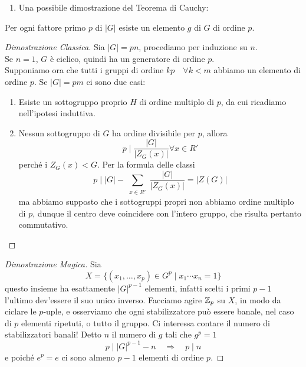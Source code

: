 \begin{multicols}{2}
\begin{enumerate}
	\item Una possibile dimostrazione del Teorema di Cauchy:
\end{enumerate}

\begin{theorem}[di Cauchy] \label{cauchy}
	Per ogni fattore primo $ p $ di $ |G| $ esiste un elemento $ g $ di $ G $ di ordine $ p $.
\end{theorem}
\begin{proof}[Dimostrazione Classica]
	Sia $ |G|= pn $, procediamo per induzione su $ n $. \\
	
	Se $ n = 1 $, $ G $ è ciclico, quindi ha un generatore di ordine $ p $. \\
	
	Supponiamo ora che tutti i gruppi di ordine $ kp  \quad\forall k < m$ abbiamo un elemento di ordine $ p $. Se $ |G|=pm $ ci sono due casi:
	\begin{enumerate}
		\item Esiste un sottogruppo proprio $ H $ di ordine multiplo di $ p $, da cui ricadiamo nell'ipotesi induttiva.
		\item Nessun sottogruppo di $ G $ ha ordine divisibile per $ p $, allora
		\[ p \mid \frac{|G|}{|Z_G(x)|} \forall x \in R' \] perché i $ Z_G(x) < G $. Per la formula delle classi
		\[ p \mid |G| - \sum_{\substack{x \in R'}} \frac{|G|}{|Z_G(x)|} = |Z(G)| \]
		ma abbiamo supposto che i sottogruppi propri non abbiamo ordine multiplo di $ p $, dunque il centro deve coincidere con l'intero gruppo, che risulta pertanto commutativo.
	\end{enumerate}
\end{proof}
\begin{proof}[Dimostrazione Magica]
	Sia $$ X = \{(x_1, \dots, x_p) \in G^p \mid x_1\cdots x_n = 1 \} $$ questo insieme ha esattamente $ |G|^{p-1} $ elementi, infatti scelti i primi $ p-1 $ l'ultimo dev'essere il suo unico inverso.
	Facciamo agire $ \mathbb{Z}_p $ su $ X $, in modo da ciclare le $ p $-uple, e osserviamo che ogni stabilizzatore può essere banale, nel caso di $ p $ elementi ripetuti, o tutto il gruppo. Ci interessa contare il numero di stabilizzatori banali!
	Detto $ n $ il numero di $ g $ tali che $ g^p = 1 $ \[ p \mid |G|^{p-1} - n \quad\Rightarrow\quad p \mid n \] e poiché $ e^p = e $ ci sono almeno $ p - 1 $ elementi di ordine $ p $.
\end{proof}


\end{multicols}
